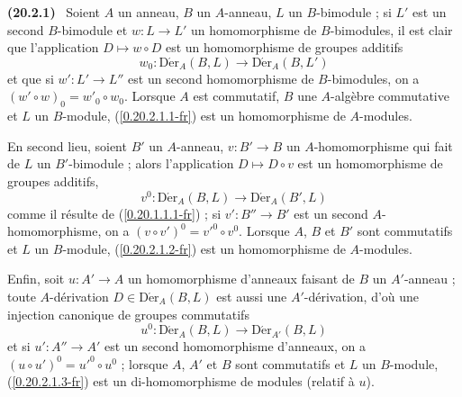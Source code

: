 \documentclass[10pt,oneside]{book}
\makeatletter
\newcommand{\sref}[1]{(\ref{#1})}
\newcommand{\setmanualcurrentlabel}[1]{\def\@currentlabel{#1}}
\newcommand{\oldpage}[2][]{%
  \setcounter{footnote}{0}%
  \marginpar{\scriptsize\textbf{#1}~|~#2}\ignorespaces}
\newenvironment{env}[1][]{\setmanualcurrentlabel{#1}\par\medskip\noindent\textbf{(#1)}\ }{\par}
\makeatother
\begin{document}
\oldpage[0\textsubscript{IV-1}]{119}
\begin{env}[20.2.1]
\label{0.20.2.1-fr}
Soient $A$ un anneau, $B$ un $A$-anneau, $L$ un $B$-bimodule ; si $L'$ est
un second $B$-bimodule et $w:L\to L'$ un homomorphisme de $B$-bimodules, il
est clair que l'application $D\mapsto w\circ D$ est un homomorphisme de
groupes additifs
\begin{equation}
\tag{20.2.1.1}
\label{0.20.2.1.1-fr}
  w_0:\operatorname{D\acute{e}r}_A(B,L)\to\operatorname{D\acute{e}r}_A(B,L')
\end{equation}
et que si $w':L'\to L''$ est un second homomorphisme de $B$-bimodules, on a
$(w'\circ w)_0=w'_0\circ w_0$. Lorsque $A$ est commutatif, $B$ une
$A$-algèbre commutative et $L$ un $B$-module, \sref{0.20.2.1.1-fr} est un
homomorphisme de $A$-modules.

En second lieu, soient $B'$ un $A$-anneau, $v:B'\to B$ un
$A$-homomorphisme qui fait de $L$ un $B'$-bimodule ; alors l'application
$D\mapsto D\circ v$ est un homomorphisme de groupes additifs,
\begin{equation}
\tag{20.2.1.2}
\label{0.20.2.1.2-fr}
  v^0:\operatorname{D\acute{e}r}_A(B,L)\to\operatorname{D\acute{e}r}_A(B',L)
\end{equation}
comme il résulte de \sref{0.20.1.1.1-fr} ; si $v':B''\to B'$ est un second
$A$-homomorphisme, on a $(v\circ v')^0=v'^0\circ v^0$. Lorsque $A$, $B$ et
$B'$ sont commutatifs et $L$ un $B$-module, \sref{0.20.2.1.2-fr} est un
homomorphisme de $A$-modules.

Enfin, soit $u:A'\to A$ un homomorphisme d'anneaux faisant de $B$ un
$A'$-anneau ; toute $A$-dérivation $D\in\operatorname{D\acute{e}r}_A(B,L)$ est aussi
une $A'$-dérivation, d'où une injection canonique de groupes commutatifs
\begin{equation}
\tag{20.2.1.3}
\label{0.20.2.1.3-fr}
  u^0:\operatorname{D\acute{e}r}_A(B,L)\to\operatorname{D\acute{e}r}_{A'}(B,L)
\end{equation}
et si $u':A''\to A'$ est un second homomorphisme d'anneaux, on a
$(u\circ u')^0=u'^0\circ u^0$ ; lorsque $A$, $A'$ et $B$ sont commutatifs et
$L$ un $B$-module, \sref{0.20.2.1.3-fr} est un di-homomorphisme de modules
(relatif à $u$).


\end{env}
\end{document}
